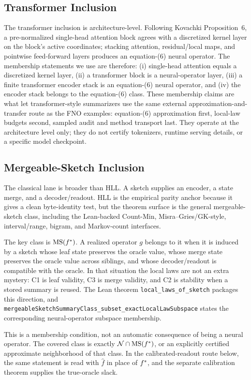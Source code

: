 \subsection{Transformer Inclusion}

The transformer inclusion is architecture-level. Following Kovachki
Proposition~6, a pre-normalized single-head attention block agrees with
a discretized kernel layer on the block's active coordinates; stacking
attention, residual/local maps, and pointwise feed-forward layers
produces an equation-(6) neural operator. The membership statements we
use are therefore: (i) single-head attention equals a discretized kernel
layer, (ii) a transformer block is a neural-operator layer, (iii) a
finite transformer encoder stack is an equation-(6) neural operator,
and (iv) the encoder stack belongs to the equation-(6) class. These
membership claims are what let transformer-style summarizers use the
same external approximation-and-transfer route as the FNO examples:
equation-(6) approximation first, local-law budgets second, sampled
audit and method transport last. They operate at the architecture level
only; they do not certify tokenizers, runtime serving details, or a
specific model checkpoint.

\subsection{Mergeable-Sketch Inclusion}

The classical lane is broader than HLL. A sketch supplies an encoder, a state
merge, and a decoder/readout. HLL is the empirical parity anchor because it
gives a clean byte-identity test, but the theorem surface is the general
mergeable-sketch class, including the Lean-backed Count-Min,
Misra--Gries/GK-style, interval/range, bigram, and Markov-count interfaces.

The key class is $\mathrm{MS}(f^\ast)$. A realized operator $g$ belongs to it
when it is induced by a sketch whose leaf state preserves the oracle value,
whose merge state preserves the oracle value across siblings, and whose
decoder/readout is compatible with the oracle. In that situation the local
laws are not an extra mystery: C1 is leaf validity, C3 is merge validity, and
C2 is stability when a stored summary is reused. The Lean theorem
\texttt{local\_laws\_of\_sketch} packages this direction, and
\texttt{mergeableSketchSummaryClass\_subset\_exactLocalLawSubspace} states the
corresponding neural-operator subspace membership.

This is a membership condition, not an automatic consequence of being a neural
operator. The covered class is exactly
$\mathcal{N}\cap \mathrm{MS}(f^\ast)$, or an explicitly certified approximate
neighborhood of that class. In the calibrated-readout route below, the same
statement is read with $\widehat f$ in place of $f^\ast$, and the separate
calibration theorem supplies the true-oracle slack.

